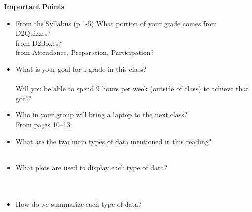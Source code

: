  \begin{center}
   {\large\bf Important Points}
 \end{center}

 \begin{itemize}
    \item From the Syllabus (p 1-5) 
       What portion of your grade comes from D2Quizzes?\\
       from D2Boxes?\\
       from Attendance, Preparation, Participation?
    \item  What is your goal for a grade in this class?\\ \\
       Will you be able to spend 9 hours per week (outside of
       class) to achieve that goal?\\
     \item Who in your group will bring a laptop to the next class?\\

       From pages 10--13:
     \item What are the two main types of data mentioned in this
       reading?\\ \\
     \item What plots are used to display each type of data? \\ \\ \\
     \item How do we summarize each type of data?\\ \\ 

 \end{itemize}